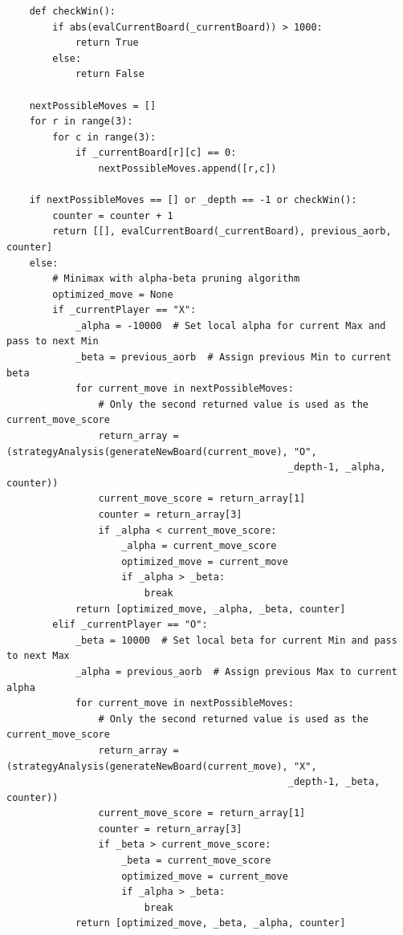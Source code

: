 \documentclass[a4paper]{scrartcl}
\begin{document}
\begin{verbatim}
    def checkWin():
        if abs(evalCurrentBoard(_currentBoard)) > 1000:
            return True
        else:
            return False

    nextPossibleMoves = []
    for r in range(3):
        for c in range(3):
            if _currentBoard[r][c] == 0:
                nextPossibleMoves.append([r,c])

    if nextPossibleMoves == [] or _depth == -1 or checkWin():
        counter = counter + 1
        return [[], evalCurrentBoard(_currentBoard), previous_aorb, counter]
    else:
        # Minimax with alpha-beta pruning algorithm
        optimized_move = None
        if _currentPlayer == "X":
            _alpha = -10000  # Set local alpha for current Max and pass to next Min
            _beta = previous_aorb  # Assign previous Min to current beta
            for current_move in nextPossibleMoves:
                # Only the second returned value is used as the current_move_score
                return_array = (strategyAnalysis(generateNewBoard(current_move), "O", 
                                                 _depth-1, _alpha, counter))
                current_move_score = return_array[1]
                counter = return_array[3]
                if _alpha < current_move_score:
                    _alpha = current_move_score
                    optimized_move = current_move
                    if _alpha > _beta:
                        break
            return [optimized_move, _alpha, _beta, counter]
        elif _currentPlayer == "O":
            _beta = 10000  # Set local beta for current Min and pass to next Max
            _alpha = previous_aorb  # Assign previous Max to current alpha
            for current_move in nextPossibleMoves:
                # Only the second returned value is used as the current_move_score
                return_array = (strategyAnalysis(generateNewBoard(current_move), "X", 
                                                 _depth-1, _beta, counter))
                current_move_score = return_array[1]
                counter = return_array[3]
                if _beta > current_move_score:
                    _beta = current_move_score
                    optimized_move = current_move
                    if _alpha > _beta:
                        break
            return [optimized_move, _beta, _alpha, counter]



\end{verbatim}
\end{document}

